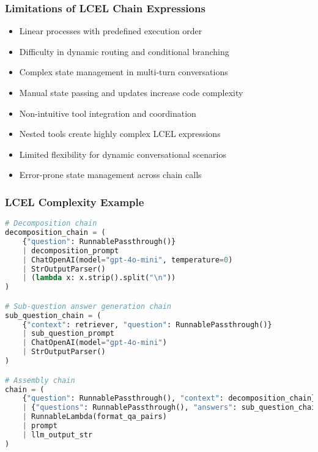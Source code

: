 \begin{frame}[fragile]\frametitle{Limitations of LCEL Chain Expressions}
      \begin{itemize}
        \item Linear processes with predefined execution order
        \item Difficulty in dynamic routing and conditional branching
        \item Complex state management in multi-turn conversations
        \item Manual state passing and updates increase code complexity
        \item Non-intuitive tool integration and coordination
        \item Nested tools create highly complex LCEL expressions
        \item Limited flexibility for dynamic conversational scenarios
        \item Error-prone state management across chain calls
      \end{itemize}
\end{frame}

\begin{frame}[fragile]\frametitle{LCEL Complexity Example}
      \begin{lstlisting}[language=Python, basicstyle=\tiny]
# Decomposition chain
decomposition_chain = (
    {"question": RunnablePassthrough()}
    | decomposition_prompt
    | ChatOpenAI(model="gpt-4o-mini", temperature=0)
    | StrOutputParser()
    | (lambda x: x.strip().split("\n"))
)

# Sub-question answer generation chain
sub_question_chain = (
    {"context": retriever, "question": RunnablePassthrough()}
    | sub_question_prompt
    | ChatOpenAI(model="gpt-4o-mini")
    | StrOutputParser()
)

# Assembly chain
chain = (
    {"question": RunnablePassthrough(), "context": decomposition_chain}
    | {"questions": RunnablePassthrough(), "answers": sub_question_chain.map()}
    | RunnableLambda(format_qa_pairs)
    | prompt
    | llm_output_str
)
      \end{lstlisting}
\end{frame}

